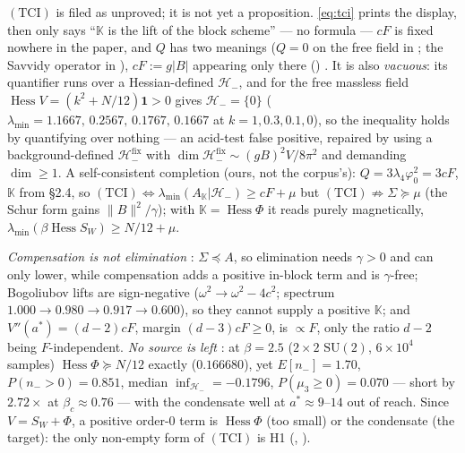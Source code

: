 $(\mathrm{TCI})$ is filed as unproved; it is not yet a proposition. \eqref{eq:tci} prints the display,
then only says ``$\mathbb K$ is the lift of the block scheme'' --- no formula --- $cF$ is fixed nowhere
in the paper, and $Q$ has two meanings ($Q=0$ on the free field in ; the Savvidy operator
in ), $cF:=g|B|$ appearing only there () \LN. It is also
\emph{vacuous}: its quantifier runs over a Hessian-defined $\mathcal H_-$, and for the free massless
field $\operatorname{Hess}V=(k^2+N/12)\mathbf 1>0$ gives $\mathcal H_-=\{0\}$ ($\lambda_{\min}=1.1667,
\,0.2567,\,0.1767,\,0.1667$ at $k=1,0.3,0.1,0$), so the inequality holds by quantifying over nothing
--- an acid-test false positive, repaired by using a background-defined $\mathcal H_-^{\mathrm{fix}}$
with $\dim\mathcal H_-^{\mathrm{fix}}\sim(gB)^2V/8\pi^2$ and demanding $\dim\ge1$. A self-consistent
completion (ours, not the corpus's): $Q=3\lambda_4\varphi_0^2=3cF$, $\mathbb K$ from
 \S2.4, so $(\mathrm{TCI})\iff\lambda_{\min}(A_{\mathbb K}|\mathcal H_-)\ge
cF+\mu$ but $(\mathrm{TCI})\not\Rightarrow\Sigma\succeq\mu$ (the Schur form gains
$\lVert B\rVert^2/\gamma$); with $\mathbb K=\operatorname{Hess}\Phi$ it reads purely magnetically,
$\lambda_{\min}(\beta\operatorname{Hess}S_W)\ge N/12+\mu$.

\emph{Compensation is not elimination} \LT: $\Sigma\preceq A$, so elimination needs $\gamma>0$ and can
only lower, while compensation adds a positive in-block term and is $\gamma$-free; Bogoliubov lifts are
sign-negative ($\omega^2\to\omega^2-4c^2$; spectrum $1.000\to0.980\to0.917\to0.600$), so they cannot
supply a positive $\mathbb K$; and $V''(a^*)=(d-2)cF$, margin $(d-3)cF\ge0$, is $\propto F$, only the
ratio $d-2$ being $F$-independent. \emph{No source is left} \LE: at $\beta=2.5$ ($2\times2$
$\mathrm{SU}(2)$, $6\times10^4$ samples) $\operatorname{Hess}\Phi\succeq N/12$ exactly ($0.166680$),
yet $E[n_-]=1.70$, $P(n_->0)=0.851$, median $\inf_{\mathcal H_-}=-0.1796$, $P(\mu_3\ge0)=0.070$ ---
short by $2.72\times$ at $\beta_c\approx0.76$ --- with the condensate well at $a^*\approx9$--$14$ out of
reach. Since $V=S_W+\Phi$, a positive order-$0$ term is $\operatorname{Hess}\Phi$ (too small) or the
condensate (the target): the only non-empty form of $(\mathrm{TCI})$ is H1 \LN{} (,
).


